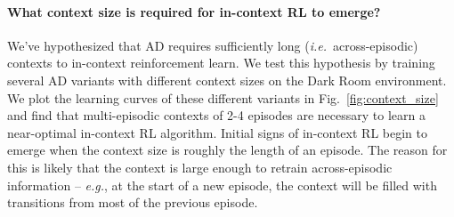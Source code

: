 \documentclass{article}
\theoremstyle{thm}
\newcommand{\name}{AD }
\newcommand{\eg}{{\it e.g.}}
\newcommand{\ie}{{\it i.e.}}
\begin{document}
\paragraph{What context size is required for in-context RL to emerge?}
We've hypothesized that \name requires sufficiently long (\ie \ across-episodic) contexts to in-context reinforcement learn. We test this hypothesis by training several \name variants with different context sizes on the Dark Room environment. We plot the learning curves of these different variants in Fig.~\ref{fig:context_size} and find that multi-episodic contexts of 2-4 episodes are necessary to learn a near-optimal in-context RL algorithm. Initial signs of in-context RL begin to emerge when the context size is roughly the length of an episode. The reason for this is likely that the context is large enough to retrain across-episodic information -- \eg, at the start of a new episode, the context will be filled with transitions from most of the previous episode.
\end{document}
